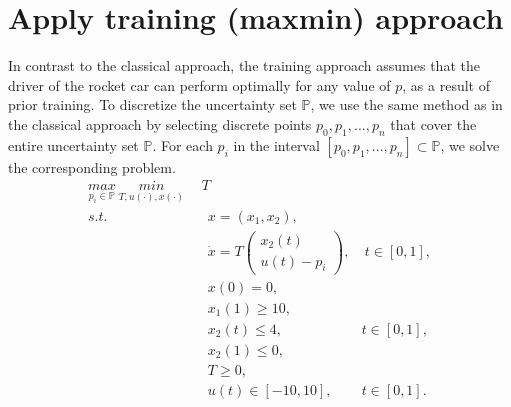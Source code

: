 \documentclass  [
  paper    = a4,
  BCOR     = 10mm,
  twoside,
  fontsize = 12pt,
  fleqn,
  toc      = bibnumbered,
  toc      = listofnumbered,
  numbers  = noendperiod,
  headings = normal,
  listof   = leveldown,
  version  = 3.03
]                                       {scrreprt}
\newcommand{\<}{\langle}
\renewcommand{\>}{\rangle}
\begin{document}
 




\section{Apply training (maxmin) approach}
In contrast to the classical approach, the training approach assumes that the driver of the rocket car can perform optimally for any value of $p$, as a result of prior training. To discretize the uncertainty set $\mathbb{P}$, we use the same method as in the classical approach by selecting discrete points $p_0, p_1, ..., p_n$ that cover the entire uncertainty set $\mathbb{P}$. For each $p_i$ in the interval $[p_0, p_1, ..., p_n] \subset \mathbb{P}$, we solve the corresponding problem.
\begin{subequations}
	\begin{align}
		 \underset{p_i \in \mathbb{P}}{max}  \ \underset{T, u(\cdot), x(\cdot)}{min}  \ \   &   T  \\ 
		s.t.  & \ \ x = (x_1, x_2),   \label{ta_rc_x} \\ 
		& \ \  \dot{x} = T  \begin{pmatrix}  x_2(t) \\ u(t)-p_i   \end{pmatrix}, & \ t \in [0,1],  \label{ta_rc_partial} \\
		& \ \ x(0) = 0, \label{ta_rc_t0}\\
		& \ \ x_1(1) \geq 10, \label{ta_rc_x1_t1} \\
		& \ \ x_2(t) \leq 4, & t \in [0,1], \label{ta_rc_x2_tc} \\
		& \ \ x_2(1) \leq 0, \label{ta_rc_x2_t1}  \\
		& \ \ T \geq 0, \\
		& \ \ u(t) \in [-10, 10], & t \in [0,1]. 
	\end{align}
	\label{TA_rc}
\end{subequations}
\end{document}
